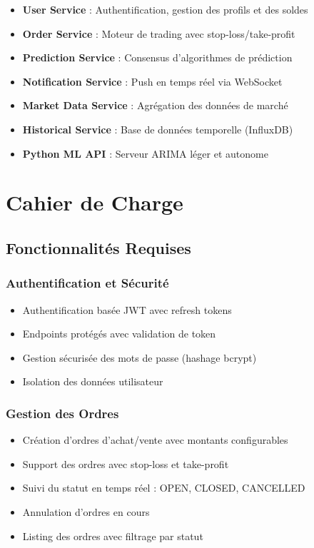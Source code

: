 \documentclass[12pt,a4paper,twoside]{report}
\begin{document}
\begin{itemize}
    \item \textbf{User Service} : Authentification, gestion des profils et des soldes
    \item \textbf{Order Service} : Moteur de trading avec stop-loss/take-profit
    \item \textbf{Prediction Service} : Consensus d'algorithmes de prédiction
    \item \textbf{Notification Service} : Push en temps réel via WebSocket
    \item \textbf{Market Data Service} : Agrégation des données de marché
    \item \textbf{Historical Service} : Base de données temporelle (InfluxDB)
    \item \textbf{Python ML API} : Serveur ARIMA léger et autonome
\end{itemize}

\chapter{Cahier de Charge}

\section{Fonctionnalités Requises}

\subsection{Authentification et Sécurité}
\begin{itemize}
    \item Authentification basée JWT avec refresh tokens
    \item Endpoints protégés avec validation de token
    \item Gestion sécurisée des mots de passe (hashage bcrypt)
    \item Isolation des données utilisateur
\end{itemize}

\subsection{Gestion des Ordres}
\begin{itemize}
    \item Création d'ordres d'achat/vente avec montants configurables
    \item Support des ordres avec stop-loss et take-profit
    \item Suivi du statut en temps réel : OPEN, CLOSED, CANCELLED
    \item Annulation d'ordres en cours
    \item Listing des ordres avec filtrage par statut
\end{itemize}
\end{document}
